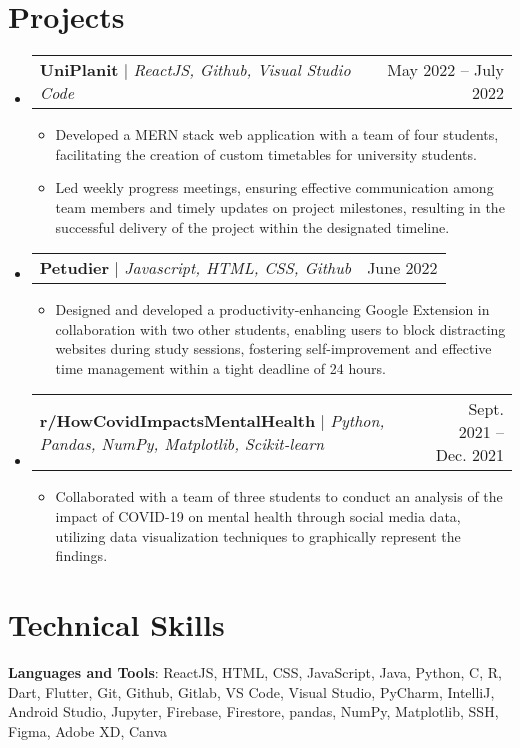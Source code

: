 \documentclass[letterpaper,11pt]{article}
\makeatletter
\newcommand{\resumeItem}[1]{
  \item\small{
    {#1 \vspace{-2pt}}
  }
}
\newcommand{\resumeProjectHeading}[2]{
    \item
    \begin{tabular*}{0.97\textwidth}{l@{\extracolsep{\fill}}r}
      \small#1 & #2 \\
    \end{tabular*}\vspace{-7pt}
}
\newcommand{\resumeSubHeadingListStart}{\begin{itemize}[leftmargin=0.15in, label={}]}
\newcommand{\resumeSubHeadingListEnd}{\end{itemize}}
\newcommand{\resumeItemListStart}{\begin{itemize}}
\newcommand{\resumeItemListEnd}{\end{itemize}\vspace{-5pt}}
\makeatother
\begin{document}
\section{Projects}
    \resumeSubHeadingListStart
      \resumeProjectHeading
          {\textbf{UniPlanit} $|$ \emph{ReactJS,  Github, Visual Studio Code}}{May 2022 -- July 2022}
          \resumeItemListStart
            \resumeItem{Developed a MERN stack web application with a team of four students, facilitating the creation of custom timetables for university students.}
            \resumeItem{Led weekly progress meetings, ensuring effective communication among team members and timely updates on project milestones, resulting in the successful delivery of the project within the designated timeline.}
          \resumeItemListEnd
      \resumeProjectHeading
          {\textbf{Petudier} $|$ \emph{Javascript, HTML, CSS, Github}}{June 2022}
          \resumeItemListStart
            \resumeItem{Designed and developed a productivity-enhancing Google Extension in collaboration with two other students, enabling users to block distracting websites during study sessions, fostering self-improvement and effective time management within a tight deadline of 24 hours.}
          \resumeItemListEnd
        \resumeProjectHeading   {\textbf{r/HowCovidImpactsMentalHealth} $|$ \emph{Python, Pandas, NumPy, Matplotlib, Scikit-learn}}{Sept. 2021 -- Dec. 2021}
          \resumeItemListStart
            \resumeItem{Collaborated with a team of three students to conduct an analysis of the impact of COVID-19 on mental health through social media data, utilizing data visualization techniques to graphically represent the findings.}
          \resumeItemListEnd
    \resumeSubHeadingListEnd



%
\section{Technical Skills}
 \begin{itemize}[leftmargin=0.15in, label={}]
    \small{\item{
     \textbf{Languages and Tools}{: ReactJS, HTML, CSS, JavaScript, Java, Python, C, R, Dart, Flutter, Git, Github, Gitlab, VS Code, Visual Studio, PyCharm, IntelliJ, Android Studio, Jupyter, Firebase, Firestore, pandas, NumPy, Matplotlib, SSH, Figma, Adobe XD, Canva} \\
    }}
 \end{itemize}


\end{document}
